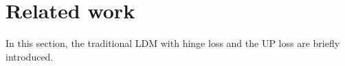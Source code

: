 \documentclass[a4paper]{cas-sc}
\begin{document}
\section{Related work}\label{2}
In this section, the traditional LDM with hinge loss and the UP loss are briefly introduced.

\end{document}
